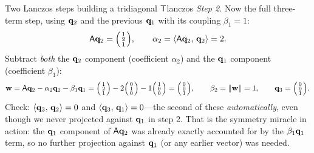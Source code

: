 \begin{workedexample}{Two Lanczos steps building a tridiagonal $\mathsf{T}$}{lanczos}
\emph{Step 2.} Now the full three-term step, using $\mathbf{q}_2$ and the previous $\mathbf{q}_1$
with its coupling $\beta_1 = 1$:
\[
  \mathsf{A}\mathbf{q}_2 = \begin{psmallmatrix} 1 \\ 2 \\ 1 \end{psmallmatrix},
  \qquad
  \alpha_2 = \left\langle \mathsf{A}\mathbf{q}_2,\, \mathbf{q}_2\right\rangle = 2 .
\]
Subtract \emph{both} the $\mathbf{q}_2$ component (coefficient $\alpha_2$) and the $\mathbf{q}_1$
component (coefficient $\beta_1$):
\[
  \mathbf{w} = \mathsf{A}\mathbf{q}_2 - \alpha_2\mathbf{q}_2 - \beta_1\mathbf{q}_1
      = \begin{psmallmatrix} 1 \\ 2 \\ 1 \end{psmallmatrix}
      - 2\begin{psmallmatrix} 0 \\ 1 \\ 0 \end{psmallmatrix}
      - 1\begin{psmallmatrix} 1 \\ 0 \\ 0 \end{psmallmatrix}
      = \begin{psmallmatrix} 0 \\ 0 \\ 1 \end{psmallmatrix},
  \qquad
  \beta_2 = \lVert\mathbf{w}\rVert = 1,
  \qquad
  \mathbf{q}_3 = \begin{psmallmatrix} 0 \\ 0 \\ 1 \end{psmallmatrix}.
\]
Check: $\left\langle \mathbf{q}_3,\, \mathbf{q}_2\right\rangle = 0$ and $\left\langle \mathbf{q}_3,\, \mathbf{q}_1\right\rangle = 0$---the second of these
\emph{automatically}, even though we never projected against $\mathbf{q}_1$ in step 2. That
is the symmetry miracle in action: the $\mathbf{q}_1$ component of $\mathsf{A}\mathbf{q}_2$ was already
exactly accounted for by the $\beta_1\mathbf{q}_1$ term, so no further projection against
$\mathbf{q}_1$ (or any earlier vector) was needed.


\end{workedexample}
